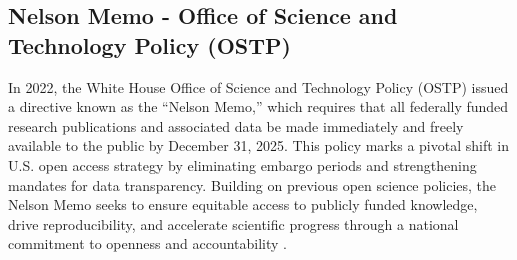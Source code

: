 \documentclass{article}
\begin{document}
\subsection{Nelson Memo - Office of Science and Technology Policy (OSTP)}

In 2022, the White House Office of Science and Technology Policy (OSTP) issued a directive known as the “Nelson Memo,” which requires that all federally funded research publications and associated data be made immediately and freely available to the public by December 31, 2025. This policy marks a pivotal shift in U.S. open access strategy by eliminating embargo periods and strengthening mandates for data transparency. Building on previous open science policies, the Nelson Memo seeks to ensure equitable access to publicly funded knowledge, drive reproducibility, and accelerate scientific progress through a national commitment to openness and accountability \cite{nelson_2023}.
\end{document}
